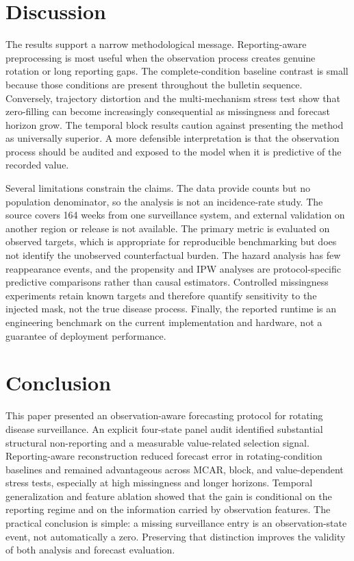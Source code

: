 \documentclass[runningheads]{llncs}
\begin{document}
\section{Discussion}\label{sec:discussion}

The results support a narrow methodological message. Reporting-aware preprocessing is most useful when the observation process creates genuine rotation or long reporting gaps. The complete-condition baseline contrast is small because those conditions are present throughout the bulletin sequence. Conversely, trajectory distortion and the multi-mechanism stress test show that zero-filling can become increasingly consequential as missingness and forecast horizon grow. The temporal block results caution against presenting the method as universally superior. A more defensible interpretation is that the observation process should be audited and exposed to the model when it is predictive of the recorded value.

Several limitations constrain the claims. The data provide counts but no population denominator, so the analysis is not an incidence-rate study. The source covers 164 weeks from one surveillance system, and external validation on another region or release is not available. The primary metric is evaluated on observed targets, which is appropriate for reproducible benchmarking but does not identify the unobserved counterfactual burden. The hazard analysis has few reappearance events, and the propensity and IPW analyses are protocol-specific predictive comparisons rather than causal estimators. Controlled missingness experiments retain known targets and therefore quantify sensitivity to the injected mask, not the true disease process. Finally, the reported runtime is an engineering benchmark on the current implementation and hardware, not a guarantee of deployment performance.

\section{Conclusion}\label{sec:conclusion}

This paper presented an observation-aware forecasting protocol for rotating disease surveillance. An explicit four-state panel audit identified substantial structural non-reporting and a measurable value-related selection signal. Reporting-aware reconstruction reduced forecast error in rotating-condition baselines and remained advantageous across MCAR, block, and value-dependent stress tests, especially at high missingness and longer horizons. Temporal generalization and feature ablation showed that the gain is conditional on the reporting regime and on the information carried by observation features. The practical conclusion is simple: a missing surveillance entry is an observation-state event, not automatically a zero. Preserving that distinction improves the validity of both analysis and forecast evaluation.
\end{document}
